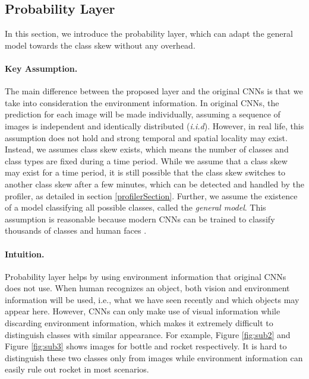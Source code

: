 \documentclass[pageno]{jpaper}
\begin{document}
\subsection{Probability Layer}
In this section, we introduce the probability layer, which can adapt the general model towards the class skew without any overhead.

\paragraph{Key Assumption.} 
The main difference between the proposed layer and the original CNNs is that we take into consideration the environment information. In original CNNs, the prediction for each image will be made individually, assuming a sequence of images is independent and identically distributed (\textit{i.i.d}). However, in real life, this assumption does not hold and strong temporal and spatial locality may exist. Instead, we assumes class skew exists, which means the number of classes and class types are fixed during a time period. While we assume that a class skew may exist for a time period, it is still possible that the class skew switches to another class skew after a few minutes, which can be detected and handled by the profiler, as detailed in section \ref{profilerSection}. Further, we assume the existence of a model classifying all possible classes, called the \textit{general model}. This assumption is reasonable because modern CNNs can be trained to classify thousands of classes \cite{krizhevsky2012imagenet, simonyan2014very, szegedy2015going, he2016deep, huang2017densely} and human faces \cite{parkhi2015deep, schroff2015facenet, taigman2015web}.

\paragraph{Intuition.}
Probability layer helps by using environment information that original CNNs does not use. When human recognizes an object, both vision and environment information will be used, i.e., what we have seen recently and which objects may appear here. However, CNNs can only make use of visual information while discarding environment information, which makes it extremely difficult to distinguish classes with similar appearance. For example, Figure \ref{fig:sub2} and Figure \ref{fig:sub3} shows images for bottle and rocket respectively. It is hard to distinguish these two classes only from images while environment information can easily rule out rocket in most scenarios. 
\end{document}
